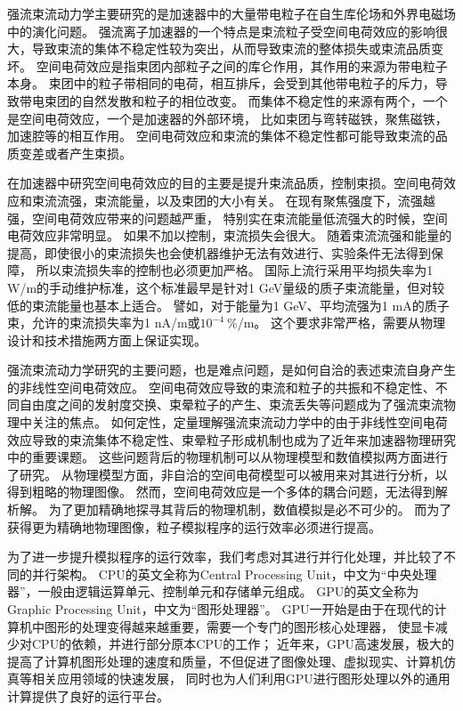 强流束流动力学主要研究的是加速器中的大量带电粒子在自生库伦场和外界电磁场中的演化问题。
强流离子加速器的一个特点是束流粒子受空间电荷效应的影响很大，导致束流的集体不稳定性较为突出，从而导致束流的整体损失或束流品质变坏。
空间电荷效应是指束团内部粒子之间的库仑作用，其作用的来源为带电粒子本身。
束团中的粒子带相同的电荷，相互排斥，会受到其他带电粒子的斥力，导致带电束团的自然发散和粒子的相位改变。
而集体不稳定性的来源有两个，一个是空间电荷效应，一个是加速器的外部环境，
比如束团与弯转磁铁，聚焦磁铁，加速腔等的相互作用。
空间电荷效应和束流的集体不稳定性都可能导致束流的品质变差或者产生束损。

在加速器中研究空间电荷效应的目的主要是提升束流品质，控制束损。空间电荷效应和束流流强，束流能量，以及束团的大小有关。
在现有聚焦强度下，流强越强，空间电荷效应带来的问题越严重，
特别实在束流能量低流强大的时候，空间电荷效应非常明显。
如果不加以控制，束流损失会很大。
随着束流流强和能量的提高，即使很小的束流损失也会使机器维护无法有效进行、实验条件无法得到保障，
所以束流损失率的控制也必须更加严格。
国际上流行采用平均损失率为1 W/m的手动维护标准，这个标准最早是针对1 GeV量级的质子束流能量，但对较低的束流能量也基本上适合。
譬如，对于能量为1 GeV、平均流强为1 mA的质子束，允许的束流损失率为1 nA/m或$10^{-4}~\%$/m。
这个要求非常严格，需要从物理设计和技术措施两方面上保证实现。

强流束流动力学研究的主要问题，也是难点问题，是如何自洽的表述束流自身产生的非线性空间电荷效应。
空间电荷效应导致的束流和粒子的共振和不稳定性、不同自由度之间的发射度交换、束晕粒子的产生、束流丢失等问题成为了强流束流物理中关注的焦点。
如何定性，定量理解强流束流动力学中的由于非线性空间电荷效应导致的束流集体不稳定性、束晕粒子形成机制也成为了近年来加速器物理研究中的重要课题。
这些问题背后的物理机制可以从物理模型和数值模拟两方面进行了研究。
从物理模型方面，非自洽的空间电荷模型可以被用来对其进行分析，以得到粗略的物理图像。
然而，空间电荷效应是一个多体的耦合问题，无法得到解析解。
为了更加精确地探寻其背后的物理机制，数值模拟是必不可少的。
而为了获得更为精确地物理图像，粒子模拟程序的运行效率必须进行提高。

为了进一步提升模拟程序的运行效率，我们考虑对其进行并行化处理，并比较了不同的并行架构。
CPU的英文全称为Central Processing Unit，中文为“中央处理器”，一般由逻辑运算单元、控制单元和存储单元组成。
GPU的英文全称为Graphic Processing Unit，中文为“图形处理器”。
GPU一开始是由于在现代的计算机中图形的处理变得越来越重要，需要一个专门的图形核心处理器，
使显卡减少对CPU的依赖，并进行部分原本CPU的工作；
近年来，GPU高速发展，极大的提高了计算机图形处理的速度和质量，不但促进了图像处理、虚拟现实、计算机仿真等相关应用领域的快速发展，
同时也为人们利用GPU进行图形处理以外的通用计算提供了良好的运行平台。

